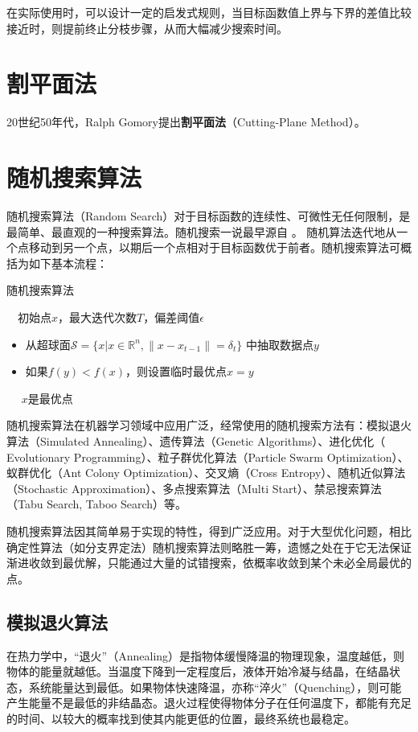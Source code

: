 在实际使用时，可以设计一定的启发式规则，当目标函数值上界与下界的差值比较接近时，则提前终止分枝步骤，从而大幅减少搜索时间。
\section{割平面法}
20世纪50年代，Ralph Gomory提出\textbf{割平面法}（Cutting-Plane Method）。

\section{随机搜索算法}
随机搜索算法（Random Search）对于目标函数的连续性、可微性无任何限制，是最简单、最直观的一种搜索算法。随机搜索一说最早源自
\cite{anderson1953recent,rastrigin1963convergence,karnopp1963random}。 随机算法迭代地从一个点移动到另一个点，以期后一个点相对于目标函数优于前者。随机搜索算法可概括为如下基本流程：
\begin{algorithm}[htbp]
        \caption{随机搜索算法}
        \begin{algorithmic}
            \REQUIRE ~~初始点$x$，最大迭代次数$T$，偏差阈值$\epsilon$\\
            \REPEAT
            \STATE
            \begin{itemize}
              \item 从超球面$\mathcal{S} = \{x|x\in \mathbb{R}^n, \|x - x_{t-1}\| = \delta_t\}$ 中抽取数据点$y$
              \item 如果$f(y) < f(x)$，则设置临时最优点$x=y$
            \end{itemize}
            \ENSURE ~~ $x$是最优点
        \end{algorithmic}
\end{algorithm}

随机搜索算法在机器学习领域中应用广泛，经常使用的随机搜索方法有：模拟退火算法（Simulated Annealing）、遗传算法（Genetic Algorithms）、进化优化（
Evolutionary Programming）、粒子群优化算法（Particle Swarm Optimization）、蚁群优化（Ant Colony Optimization）、交叉熵（Cross Entropy）、随机近似算法（Stochastic Approximation）、多点搜索算法（Multi Start）、禁忌搜索算法（Tabu Search, Taboo Search）\cite{glover1990tabu}等。

随机搜索算法因其简单易于实现的特性，得到广泛应用。对于大型优化问题，相比确定性算法（如分支界定法）随机搜索算法则略胜一筹，遗憾之处在于它无法保证渐进收敛到最优解，只能通过大量的试错搜索，依概率收敛到某个未必全局最优的点。

\subsection{模拟退火算法}
在热力学中，“退火”（Annealing）是指物体缓慢降温的物理现象，温度越低，则物体的能量就越低。当温度下降到一定程度后，液体开始冷凝与结晶，在结晶状态，系统能量达到最低。如果物体快速降温，亦称“淬火”（Quenching），则可能产生能量不是最低的非结晶态。退火过程使得物体分子在任何温度下，都能有充足的时间、以较大的概率找到使其内能更低的位置，最终系统也最稳定。

